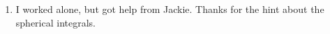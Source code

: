 \documentclass[12pt,a4]{article}
\begin{document}
\begin{enumerate}
\begin{enumerate}
    \end{enumerate}
  \item
    I worked alone, but got help from Jackie. Thanks for the hint about the spherical integrals.
\end{enumerate}
\end{document}
